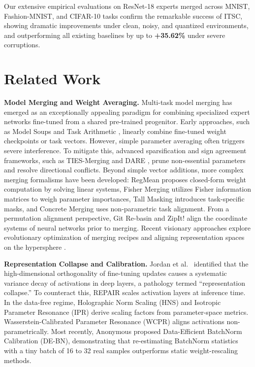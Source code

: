 \documentclass{article}
\theoremstyle{plain}
\theoremstyle{definition}
\theoremstyle{remark}
\begin{document}
Our extensive empirical evaluations on ResNet-18 experts merged across MNIST, Fashion-MNIST, and CIFAR-10 tasks confirm the remarkable success of ITSC, showing dramatic improvements under clean, noisy, and quantized environments, and outperforming all existing baselines by up to \textbf{+35.62\%} under severe corruptions.

\section{Related Work}
\label{sec:related}

\textbf{Model Merging and Weight Averaging.} Multi-task model merging has emerged as an exceptionally appealing paradigm for combining specialized expert networks fine-tuned from a shared pre-trained progenitor. Early approaches, such as Model Soups \cite{wortsman22} and Task Arithmetic \cite{ilharco23}, linearly combine fine-tuned weight checkpoints or task vectors. However, simple parameter averaging often triggers severe interference. To mitigate this, advanced sparsification and sign agreement frameworks, such as TIES-Merging \cite{yadav23} and DARE \cite{yu24}, prune non-essential parameters and resolve directional conflicts. Beyond simple vector additions, more complex merging formalisms have been developed: RegMean \cite{jin23regmean} proposes closed-form weight computation by solving linear systems, Fisher Merging \cite{matena22fisher} utilizes Fisher information matrices to weigh parameter importances, Tall Masking \cite{wortsman23tallmask} introduces task-specific masks, and Concrete Merging \cite{choshen23concrete} uses non-parametric task alignment. From a permutation alignment perspective, Git Re-basin \cite{ainsworth23} and ZipIt! \cite{stoica24} align the coordinate systems of neural networks prior to merging. Recent visionary approaches explore evolutionary optimization of merging recipes \cite{akiba24evolutionary} and aligning representation spaces on the hypersphere \cite{ortiz24spherical}.

\textbf{Representation Collapse and Calibration.} Jordan et al.\ \cite{jordan23} identified that the high-dimensional orthogonality of fine-tuning updates causes a systematic variance decay of activations in deep layers, a pathology termed ``representation collapse.'' To counteract this, REPAIR \cite{jordan23} scales activation layers at inference time. In the data-free regime, Holographic Norm Scaling (HNS) and Isotropic Parameter Resonance (IPR) \cite{leclaire24} derive scaling factors from parameter-space metrics. Wasserstein-Calibrated Parameter Resonance (WCPR) aligns activations non-parametrically. Most recently, Anonymous \cite{anonymous26a} proposed Data-Efficient BatchNorm Calibration (DE-BN), demonstrating that re-estimating BatchNorm statistics with a tiny batch of 16 to 32 real samples outperforms static weight-rescaling methods.
\end{document}
